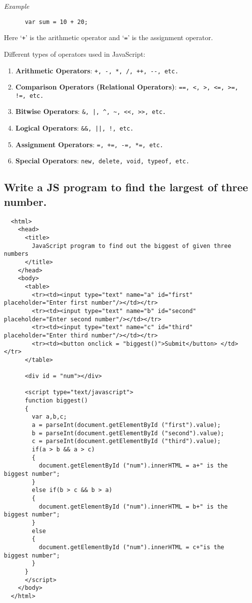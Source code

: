 \documentclass[a4paper]{article}
\begin{document}
    \textit{Example}
    \begin{lstlisting}
      var sum = 10 + 20;
    \end{lstlisting}
    Here `\texttt{+}' is the arithmetic operator and `\texttt{=}' is the assignment operator.

    Different types of operators used in JavaScript:
    \begin{enumerate}
      \item \textbf{Arithmetic Operators}:
        \verb|+, -, *, /, ++, --, etc.|
      \item \textbf{Comparison Operators (Relational Operators)}:
        \verb|==, <, >, <=, >=, !=, etc.|
    
      \item \textbf{Bitwise Operators}:
        \verb+&, |, ^, ~, <<, >>, etc.+
    
      \item \textbf{Logical Operators}:
        \verb+&&, ||, !, etc.+
    
      \item \textbf{Assignment Operators}:
        \verb|=, +=, -=, *=, etc.|
    
      \item \textbf{Special Operators}:
        \verb|new, delete, void, typeof, etc.|
    \end{enumerate}%

  \subsection{Write a JS program to find the largest of three number.}%
  \begin{lstlisting}
  <html>
    <head>
      <title>
        JavaScript program to find out the biggest of given three numbers
      </title>
    </head>
    <body>
      <table>
        <tr><td><input type="text" name="a" id="first" placeholder="Enter first number"/></td></tr>
        <tr><td><input type="text" name="b" id="second" placeholder="Enter second number"/></td></tr>
        <tr><td><input type="text" name="c" id="third" placeholder="Enter third number"/></td></tr>
        <tr><td><button onclick = "biggest()">Submit</button> </td> </tr>
      </table>
      
      <div id = "num"></div>
    
      <script type="text/javascript">
      function biggest()
      {
        var a,b,c;
        a = parseInt(document.getElementById ("first").value);
        b = parseInt(document.getElementById ("second").value);
        c = parseInt(document.getElementById ("third").value);
        if(a > b && a > c)
        {
          document.getElementById ("num").innerHTML = a+" is the biggest number";
        }
        else if(b > c && b > a)
        {
          document.getElementById ("num").innerHTML = b+" is the biggest number";
        }
        else
        {
          document.getElementById ("num").innerHTML = c+"is the biggest number";
        }
      }
      </script>
    </body>
  </html>
  \end{lstlisting}%
\end{document}
